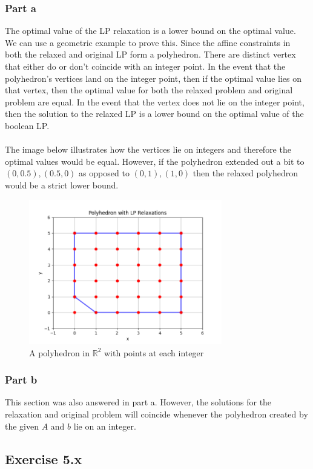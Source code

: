 \subsubsection{Part a}
The optimal value of the LP relaxation is a lower bound on the optimal value. We can use a geometric example to prove this. Since the affine constraints in both the relaxed and original LP form a polyhedron. There are distinct vertex that either do or don't coincide with an integer point. In the event that the polyhedron's vertices land on the integer point, then if the optimal value lies on that vertex, then the optimal value for both the relaxed problem and original problem are equal. In the event that the vertex does not lie on the integer point, then the solution to the relaxed LP is a lower bound on the optimal value of the boolean LP.  \\ \\
The image below illustrates how the vertices lie on integers and therefore the optimal values would be equal. However, if the polyhedron extended out a bit to $(0,0.5),(0.5,0)$ as opposed to $(0,1),(1,0)$ then the relaxed polyhedron would be a strict lower bound.
\begin{figure}[htbp]
  \centerline{\includegraphics[width=0.75\textwidth]{hw5/lp_relaxed_polyhedron.png}}
  \caption{A polyhedron in $\mathbb{R}^2$ with points at each integer}
  \label{fig:lp_relaxed_polyhedron}
\end{figure} 
\subsubsection{Part b}
This section was also answered in part a. However, the solutions for the relaxation and original problem will coincide whenever the polyhedron created by the given $A$ and $b$ lie on an integer.

\subsection{Exercise 5.x}

